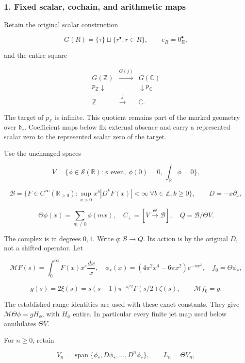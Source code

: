\subsubsection{1. Fixed scalar, cochain, and arithmetic
maps}\label{pr_14:fixed-scalar-cochain-and-arithmetic-maps}

Retain the original scalar construction

\[G(R)=\{\tau\}\sqcup\{r^\bullet:r\in R\},\qquad e_R=0_R^\bullet,\]

and the entire square

\[\boxed{\begin{array}{ccc}
G(\mathbb Z)&\xrightarrow{G(j)}&G(\mathbb C)\\
p_{\mathbb Z}\downarrow&&\downarrow p_{\mathbb C}\\
\mathbb Z&\xrightarrow{j}&\mathbb C.
\end{array}}\tag{1.1}\]

The target of \(p_{\mathbb Z}\) is infinite. This quotient remains part
of the marked geometry over \(\mathfrak b_\tau\). Coefficient maps below
fix external absence and carry a represented scalar zero to the
represented scalar zero of the target.

Use the unchanged spaces

\[V=\{\phi\in\mathcal S(\mathbb R):\phi\text{ even},\ \phi(0)=0,\ \int_{\mathbb R}\phi=0\},\]

\[\mathscr B=\{F\in C^\infty(\mathbb R_{>0}):\sup_{x>0}x^b|D^kF(x)|<\infty\ \forall b\in\mathbb Z,k\ge0\},\qquad D=-x\partial_x,\]

\[\Theta\phi(x)=\sum_{m\ne0}\phi(mx),\quad C_+=[V\xrightarrow{\Theta}\mathscr B],\quad Q=\mathscr B/\Theta V.\]

The complex is in degrees \(0,1\). Write \(q:\mathscr B\to Q\). Its
action is by the original \(D\), not a shifted operator. Let

\[\mathcal MF(s)=\int_0^\infty F(x)x^s\frac{dx}{x},\quad
\phi_*(x)=(4\pi^2x^4-6\pi x^2)e^{-\pi x^2},\quad f_0=\Theta\phi_*,\]

\[g(s)=2\xi(s)=s(s-1)\pi^{-s/2}\Gamma(s/2)\zeta(s),\qquad\mathcal Mf_0=g.\tag{1.2}\]

The established range identities are used with these exact constants.
They give \(\mathcal M\Theta\phi=gH_\phi\), with \(H_\phi\) entire. In
particular every finite jet map used below annihilates \(\Theta V\).

For \(n\ge0\), retain

\[V_n=\operatorname{span}\{\phi_*,D\phi_*,\ldots,D^n\phi_*\},\qquad L_n=\Theta V_n,\]


